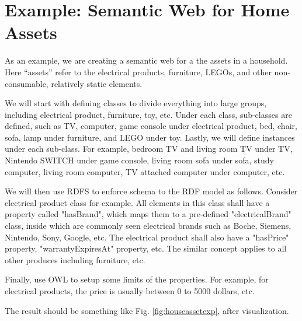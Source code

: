 \section{Example: Semantic Web for Home Assets}

As an example, we are creating a semantic web for a the assets in a household. Here ``assets'' refer to the electrical products, furniture, LEGOs, and other non-consumable, relatively static elements. 

We will start with defining classes to divide everything into large groups, including electrical product, furniture, toy, etc. Under each class, sub-classes are defined, such as TV, computer, game console under electrical product, bed, chair, sofa, lamp under furniture, and LEGO under toy. Lastly, we will define instances under each sub-class. For example, bedroom TV and living room TV under TV, Nintendo SWITCH under game console, living room sofa under sofa, study computer, living room computer, TV attached computer under computer, etc.

We will then use RDFS to enforce schema to the RDF model as follows. Consider electrical product class for example. All elements in this class shall have a property called "hasBrand", which maps them to a pre-defined "electricalBrand" class, inside which are commonly seen electrical brands such as Boche, Siemens, Nintendo, Sony, Google, etc. The electrical product shall also have a "hasPrice" property, "warrantyExpiresAt" property, etc. The similar concept applies to all other produces including furniture, etc.

Finally, use OWL to setup some limits of the properties. For example, for electrical products, the price is usually between 0 to 5000 dollars, etc.

The result should be something like Fig. \ref{fig:houseassetexp}, after visualization.

